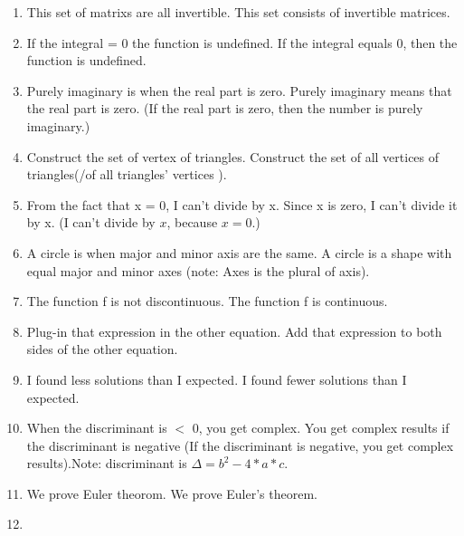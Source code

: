 \documentclass[11pt]{article}
\begin{document}
\begin{enumerate}
\item
This set of matrixs are all invertible. \textrightarrow \hspace*{0.25cm} This set consists of invertible matrices.
\item
If the integral = 0 the function is undefined. \textrightarrow \hspace*{0.25cm} If the integral equals 0, then the function is undefined.
\item
Purely imaginary is when the real part is zero. \textrightarrow \hspace*{0.25cm} Purely imaginary means that the real part is zero. (If the real part is zero, then the number is purely imaginary.)
\item
Construct the set of vertex of triangles. \textrightarrow \hspace*{0.25cm}  Construct the set of all vertices of triangles(/of all triangles' vertices ).
\item
From the fact that x = 0, I can't divide by x. \textrightarrow \hspace*{0.25cm} Since x is zero, I can’t divide it by x. (I can't divide by $x$, because $x=0$.)
\item
A circle is when major and minor axis are the same. \textrightarrow \hspace*{0.25cm} A circle is a shape with equal major and minor axes (note: Axes is the plural of axis).
\item
The function f is not discontinuous. \textrightarrow \hspace*{0.25cm} The function f is continuous.
\item
Plug-in that expression in the other equation. \textrightarrow \hspace*{0.25cm} Add that expression to both sides of the other equation.
\item
I found less solutions than I expected. \textrightarrow \hspace*{0.25cm} I found fewer solutions than I expected.
\item
When the discriminant is $<$ 0, you get complex. \textrightarrow \hspace*{0.25cm} You get complex results if the discriminant is negative (If the discriminant is negative, you get complex results).Note: discriminant is  $ \Delta = b^2 - 4*a*c $.
\item
We prove Euler theorom. \textrightarrow \hspace*{0.25cm} We prove Euler's theorem.
\item

\end{enumerate}
\end{document}

